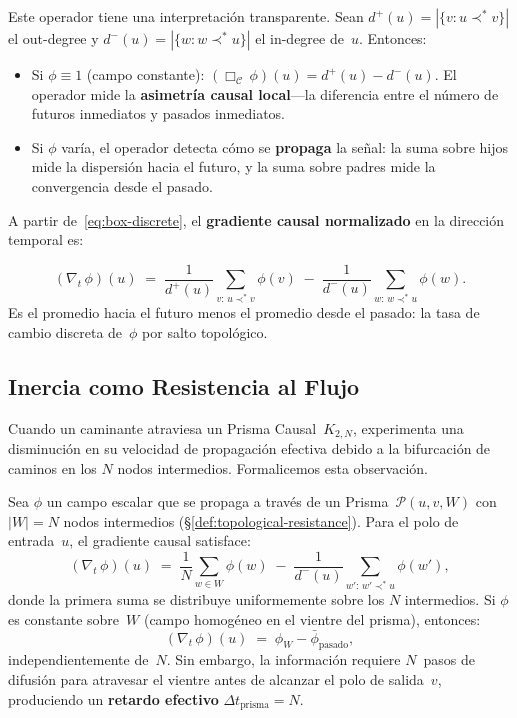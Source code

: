 \documentclass[11pt, a4paper, openany]{book}
\newcommand{\covers}{\prec^{\!*}}
\begin{document}
\noindent
Este operador tiene una interpretaci\'on transparente. Sean
$d^+(u) = |\{v : u \covers v\}|$ el out-degree y
$d^-(u) = |\{w : w \covers u\}|$ el in-degree de~$u$. Entonces:
\begin{itemize}
  \item Si $\phi \equiv 1$ (campo constante):
    $(\Box_{\mathcal{C}}\,\phi)(u) = d^+(u) - d^-(u)$.
    El operador mide la \textbf{asimetr\'ia causal local}---la
    diferencia entre el n\'umero de futuros inmediatos y pasados
    inmediatos.
  \item Si $\phi$ var\'ia, el operador detecta c\'omo se
    \textbf{propaga} la se\~nal: la suma sobre hijos mide la
    dispersi\'on hacia el futuro, y la suma sobre padres mide la
    convergencia desde el pasado.
\end{itemize}

\noindent
A partir de~\eqref{eq:box-discrete}, el \textbf{gradiente causal
normalizado} en la direcci\'on temporal es:

\begin{definition}
\label{def:causal-gradient}
\begin{equation}
  (\nabla_t\,\phi)(u)
  \;=\;
  \frac{1}{d^+(u)}\sum_{v :\, u \covers v} \phi(v)
  \;-\;
  \frac{1}{d^-(u)}\sum_{w :\, w \covers u} \phi(w).
  \label{eq:causal-gradient}
\end{equation}
Es el promedio hacia el futuro menos el promedio desde el pasado: la
tasa de cambio discreta de~$\phi$ por salto topol\'ogico.
\end{definition}

\subsection{Inercia como Resistencia al Flujo}

Cuando un caminante atraviesa un Prisma Causal~$K_{2,N}$, experimenta
una disminuci\'on en su velocidad de propagaci\'on efectiva debido a la
bifurcaci\'on de caminos en los $N$ nodos intermedios. Formalicemos
esta observaci\'on.

\begin{theorem}
\label{thm:gradient-delay}
Sea $\phi$ un campo escalar que se propaga a trav\'es de un
Prisma~$\mathcal{P}(u,v,W)$ con $|W| = N$ nodos intermedios
(\S\ref{def:topological-resistance}). Para el polo de
entrada~$u$, el gradiente causal satisface:
\begin{equation}
  (\nabla_t\,\phi)(u)
  \;=\;
  \frac{1}{N}\sum_{w \in W} \phi(w)
  \;-\;
  \frac{1}{d^-(u)}\sum_{w' :\, w' \covers u} \phi(w'),
  \label{eq:gradient-prism}
\end{equation}
donde la primera suma se distribuye uniformemente sobre los $N$
intermedios. Si $\phi$ es constante sobre~$W$ (campo homog\'eneo en
el vientre del prisma), entonces:
\[
  (\nabla_t\,\phi)(u)
  \;=\; \phi_W - \bar{\phi}_{\text{pasado}},
\]
independientemente de~$N$. Sin embargo, la informaci\'on requiere
$N$~pasos de difusi\'on para atravesar el vientre antes de alcanzar el
polo de salida~$v$, produciendo un \textbf{retardo efectivo}
$\Delta t_{\text{prisma}} = N$.
\end{theorem}
\end{document}

